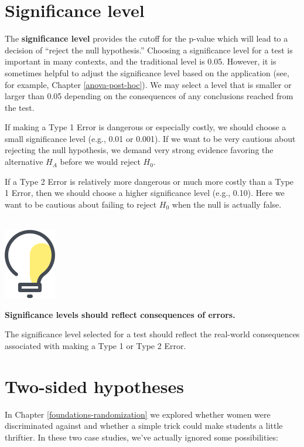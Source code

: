 \documentclass[
  10pt,
  openany]{book}
\newenvironment{mdframedwithfootTipDataPro}
{   
    \savenotes
    \begin{mdframed}[%
    topline=true, bottomline=true, linecolor=oiGray, linewidth=0.5pt,
    rightline=false, leftline=false,
    backgroundcolor=oiLGray]
    \renewcommand{\thempfootnote}{\arabic{footnote}}
    }
{
    \end{mdframed}
    \spewnotes
}
\newenvironment{tip}{
\vspace{4mm}
\begin{mdframedwithfootTipDataPro}
\begin{minipage}[t]{0.10\textwidth}
{$\:$ \\ \setkeys{Gin}{width=2em,keepaspectratio}\includegraphics{images/_icons/tip.png}}
\end{minipage}
\hfill
\begin{minipage}[t]{0.90\textwidth}
\vspace{-2mm}
\setlength{\parskip}{1em}
}{\end{minipage}
\end{mdframedwithfootTipDataPro}
\vspace{4mm}
}
\begin{document}
\clearpage

\hypertarget{significance-level}{%
\section{Significance level}\label{significance-level}}


The \textbf{significance level} provides the cutoff for the p-value which will lead to a decision of ``reject the null hypothesis.'' Choosing a significance level for a test is important in many contexts, and the traditional level is 0.05.
However, it is sometimes helpful to adjust the significance level based on the application (see, for example, Chapter \ref{anova-post-hoc}).
We may select a level that is smaller or larger than 0.05 depending on the consequences of any conclusions reached from the test.

If making a Type 1 Error is dangerous or especially costly, we should choose a small significance level (e.g., 0.01 or 0.001).
If we want to be very cautious about rejecting the null hypothesis, we demand very strong evidence favoring the alternative \(H_A\) before we would reject \(H_0.\)

If a Type 2 Error is relatively more dangerous or much more costly than a Type 1 Error, then we should choose a higher significance level (e.g., 0.10).
Here we want to be cautious about failing to reject \(H_0\) when the null is actually false.

\begin{tip}
\textbf{Significance levels should reflect consequences of errors.}

The significance level selected for a test should reflect the real-world consequences associated with making a Type 1 or Type 2 Error.

\end{tip}

\hypertarget{two-sided-hypotheses}{%
\section{Two-sided hypotheses}\label{two-sided-hypotheses}}


In Chapter \ref{foundations-randomization} we explored whether women were discriminated against and whether a simple trick could make students a little thriftier.
In these two case studies, we've actually ignored some possibilities:
\end{document}
